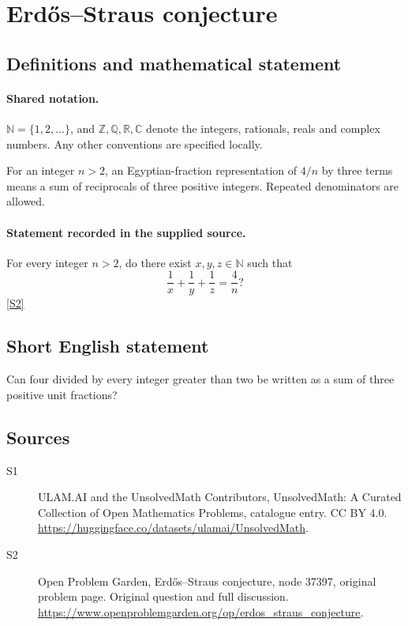 \documentclass[11pt]{article}
\newcommand{\sref}[2]{\hyperlink{source:#1:#2}{[S#2]}}
\begin{document}
\section{Erdős–Straus conjecture}\label{statement}

\subsection{Definitions and mathematical statement}

\paragraph{Shared notation.}$\mathbb N=\{1,2,\ldots\}$, and $\mathbb Z,\mathbb Q,\mathbb R,\mathbb C$ denote the integers, rationals, reals and complex numbers. Any other conventions are specified locally.


For an integer $n>2$, an Egyptian-fraction representation of $4/n$ by three terms means a sum of reciprocals of three positive integers. Repeated denominators are allowed.
\paragraph{Statement recorded in the supplied source.}
For every integer $n>2$, do there exist $x,y,z\in\mathbb N$ such that\[ \frac1x+\frac1y+\frac1z=\frac4n? \] \sref{statement}{2}
\subsection{Short English statement}
Can four divided by every integer greater than two be written as a sum of three positive unit fractions?
\subsection{Sources}
\begin{description}
\item[\hypertarget{source:statement:1}{S1}] ULAM.AI and the UnsolvedMath Contributors, UnsolvedMath: A Curated Collection of Open Mathematics Problems, catalogue entry. CC BY 4.0. \url{https://huggingface.co/datasets/ulamai/UnsolvedMath}.
\item[\hypertarget{source:statement:2}{S2}] Open Problem Garden, Erdős–Straus conjecture, node 37397, original problem page. Original question and full discussion. \url{https://www.openproblemgarden.org/op/erdos_straus_conjecture}.

\end{description}
\label{end:statement}
\end{document}
